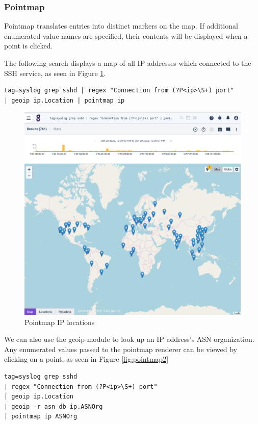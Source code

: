 \subsubsection{Pointmap}

Pointmap translates entries into distinct markers on the map. If
additional enumerated value names are specified, their contents will be
displayed when a point is clicked.

The following search displays a map of all IP addresses which connected to the SSH service, as seen in Figure \ref{fig:pointmap-ip}.

\begin{Verbatim}[breaklines=true]
tag=syslog grep sshd | regex "Connection from (?P<ip>\S+) port"
| geoip ip.Location | pointmap ip
\end{Verbatim}

\begin{figure}
	\includegraphics[width=0.6\linewidth]{images/pointmap-ip.png}
	\caption{Pointmap IP locations}
	\label{fig:pointmap-ip}
\end{figure}

We can also use the geoip module to look up an IP address's ASN organization. Any enumerated values passed to the pointmap renderer can be viewed by clicking on a point, as seen in Figure \ref{fig:pointmap2}

\begin{Verbatim}[breaklines=true]
tag=syslog grep sshd 
| regex "Connection from (?P<ip>\S+) port" 
| geoip ip.Location 
| geoip -r asn_db ip.ASNOrg 
| pointmap ip ASNOrg
\end{Verbatim}

